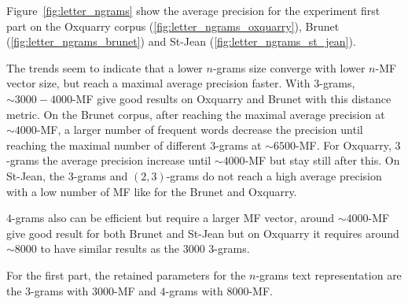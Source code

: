 Figure~\ref{fig:letter_ngrams} show the average precision for the experiment first part on the Oxquarry corpus (\ref{fig:letter_ngrams_oxquarry}), Brunet (\ref{fig:letter_ngrams_brunet}) and St-Jean (\ref{fig:letter_ngrams_st_jean}).

The trends seem to indicate that a lower $n$-grams size converge with lower $n$-MF vector size, but reach a maximal average precision faster.
With $3$-grams, $\sim 3000-4000$-MF give good results on Oxquarry and Brunet with this distance metric.
On the Brunet corpus, after reaching the maximal average precision at $\sim 4000$-MF, a larger number of frequent words decrease the precision until reaching the maximal number of different $3$-grams at $\sim 6500$-MF.
For Oxquarry, $3$-grams the average precision increase until $\sim 4000$-MF but stay still after this.
On St-Jean, the $3$-grams and $(2,3)$-grams do not reach a high average precision with a low number of MF like for the Brunet and Oxquarry.

$4$-grams also can be efficient but require a larger MF vector, around $\sim 4000$-MF give good result for both Brunet and St-Jean but on Oxquarry it requires around $\sim 8000$ to have similar results as the $3000$ $3$-grams.

For the first part, the retained parameters for the $n$-grams text representation are the $3$-grams with $3000$-MF and $4$-grams with $8000$-MF.

